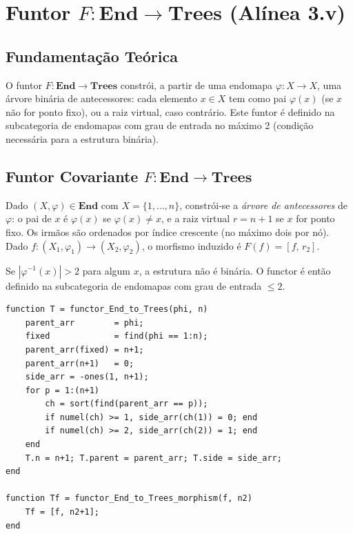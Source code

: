 \section{Funtor $F: \mathbf{End} \to \mathbf{Trees}$ (Alínea 3.v)}
\label{sec:functor-end-trees}

\subsection{Fundamentação Teórica}

O funtor $F: \mathbf{End} \to \mathbf{Trees}$ constrói, a partir de uma endomapa $\varphi: X \to X$, uma árvore binária de antecessores: cada elemento $x \in X$ tem como pai $\varphi(x)$ (se $x$ não for ponto fixo), ou a raiz virtual, caso contrário. Este funtor é definido na subcategoria de endomapas com grau de entrada no máximo 2 (condição necessária para a estrutura binária).

\subsection{Funtor Covariante $F: \mathbf{End} \to \mathbf{Trees}$}

\begin{definition}
Dado $(X, \varphi) \in \mathbf{End}$ com $X = \{1,\ldots,n\}$, constrói-se a \emph{árvore de antecessores} de $\varphi$: o pai de $x$ é $\varphi(x)$ se $\varphi(x) \neq x$, e a raiz virtual $r = n{+}1$ se $x$ for ponto fixo. Os irmãos são ordenados por índice crescente (no máximo dois por nó). Dado $f: (X_1, \varphi_1) \to (X_2, \varphi_2)$, o morfismo induzido é $F(f) = [f,\,r_2]$.
\end{definition}

\begin{remark}
Se $|\varphi^{-1}(x)| > 2$ para algum $x$, a estrutura não é binária. O functor é então definido na subcategoria de endomapas com grau de entrada $\leq 2$.
\end{remark}

\begin{lstlisting}[style=matlab, caption={Funtor covariante $F: \mathbf{End} \to \mathbf{Trees}$}]
function T = functor_End_to_Trees(phi, n)
    parent_arr        = phi;
    fixed             = find(phi == 1:n);
    parent_arr(fixed) = n+1;
    parent_arr(n+1)   = 0;
    side_arr = -ones(1, n+1);
    for p = 1:(n+1)
        ch = sort(find(parent_arr == p));
        if numel(ch) >= 1, side_arr(ch(1)) = 0; end
        if numel(ch) >= 2, side_arr(ch(2)) = 1; end
    end
    T.n = n+1; T.parent = parent_arr; T.side = side_arr;
end

function Tf = functor_End_to_Trees_morphism(f, n2)
    Tf = [f, n2+1];
end
\end{lstlisting}

